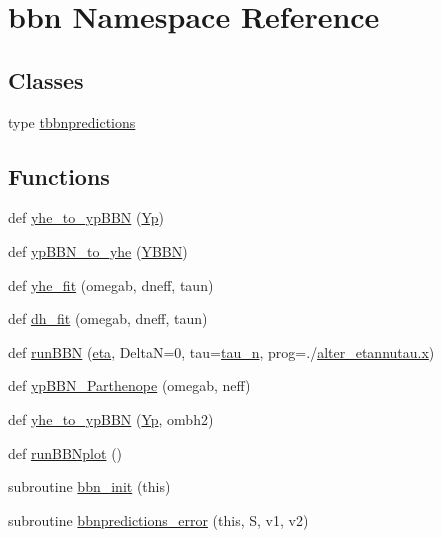 \hypertarget{namespacebbn}{}\section{bbn Namespace Reference}
\label{namespacebbn}
\subsection*{Classes}
\begin{DoxyCompactItemize}
\item 
type \mbox{\hyperlink{structbbn_1_1tbbnpredictions}{tbbnpredictions}}
\end{DoxyCompactItemize}
\subsection*{Functions}
\begin{DoxyCompactItemize}
\item 
def \mbox{\hyperlink{namespacebbn_a2847147342b47e9a0dcfffe3f33ba3c8}{yhe\+\_\+to\+\_\+yp\+B\+BN}} (\mbox{\hyperlink{namespacebbn_a6d7727016804233cd030bc94e1f3500d}{Yp}})
\item 
def \mbox{\hyperlink{namespacebbn_a1aba6aa3826014d84016987b47e11b9a}{yp\+B\+B\+N\+\_\+to\+\_\+yhe}} (\mbox{\hyperlink{namespacebbn_a14098dbddadc5e64b5441f3d19aaf7c1}{Y\+B\+BN}})
\item 
def \mbox{\hyperlink{namespacebbn_a661709a863752020661d412858487224}{yhe\+\_\+fit}} (omegab, dneff, taun)
\item 
def \mbox{\hyperlink{namespacebbn_aeb738a501c7541234a13c16aeb6dbdf7}{dh\+\_\+fit}} (omegab, dneff, taun)
\item 
def \mbox{\hyperlink{namespacebbn_ae72b1fc1114a29eb8f18c248cf2809a2}{run\+B\+BN}} (\mbox{\hyperlink{namespacebbn_ace64c472b0c59f5fd0f811cd4dcdc2b4}{eta}}, DeltaN=0, tau=\mbox{\hyperlink{namespacebbn_a159aaa1465ea9c0555826fa3ea17d3ed}{tau\+\_\+n}}, prog=\textquotesingle{}./\mbox{\hyperlink{plotTT_8m_a9336ebf25087d91c818ee6e9ec29f8c1}{alter\+\_\+etannutau.\+x}}\textquotesingle{})
\item 
def \mbox{\hyperlink{namespacebbn_a16582965b56bffa4937822750bf05aae}{yp\+B\+B\+N\+\_\+\+Parthenope}} (omegab, neff)
\item 
def \mbox{\hyperlink{namespacebbn_a67d007a7323c319fdeaa32c288092939}{yhe\+\_\+to\+\_\+yp\+B\+BN}} (\mbox{\hyperlink{namespacebbn_a6d7727016804233cd030bc94e1f3500d}{Yp}}, ombh2)
\item 
def \mbox{\hyperlink{namespacebbn_a3b8ec567ef2fdae1e1daf85d6d520717}{run\+B\+B\+Nplot}} ()
\item 
subroutine \mbox{\hyperlink{namespacebbn_a7da9f22f9be32950185f79ed74e69f4d}{bbn\+\_\+init}} (this)
\item 
subroutine \mbox{\hyperlink{namespacebbn_a89ea6267ce0d1cfa1ff459d517558a53}{bbnpredictions\+\_\+error}} (this, S, v1, v2)
\end{DoxyCompactItemize}
